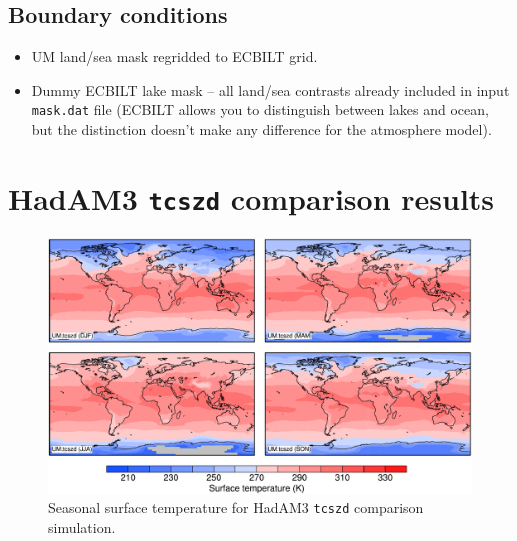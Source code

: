 \documentclass[a4paper,11pt,article]{article}
\begin{document}
\subsection{Boundary conditions}

\begin{itemize}
  \item{UM land/sea mask regridded to ECBILT grid.}
  \item{Dummy ECBILT lake mask -- all land/sea contrasts already
    included in input \texttt{mask.dat} file (ECBILT allows you to
    distinguish between lakes and ocean, but the distinction doesn't
    make any difference for the atmosphere model).}
\end{itemize}


\appendix
\section{HadAM3 \texttt{tcszd} comparison results}
\label{sec:hadam3}

\begin{figure}
  \begin{center}
    \includegraphics[width=\textwidth]{../hadam3-comparison/plots/ts-plots}
  \end{center}
  \caption{Seasonal surface temperature for HadAM3 \texttt{tcszd}
    comparison simulation.}
  \label{fig:ts-hadam3}
\end{figure}
\end{document}
